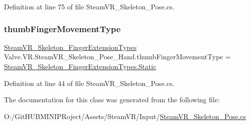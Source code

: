 Definition at line 75 of file Steam\+V\+R\+\_\+\+Skeleton\+\_\+\+Pose.\+cs.

\mbox{\label{class_valve_1_1_v_r_1_1_steam_v_r___skeleton___pose___hand_a4665f3a9254a6991ccf50ac84743b339}} 
\subsubsection{\texorpdfstring{thumbFingerMovementType}{thumbFingerMovementType}}
{\footnotesize\ttfamily \mbox{\hyperlink{namespace_valve_1_1_v_r_af4f7ce87893374f71b2fa2ba112642da}{Steam\+V\+R\+\_\+\+Skeleton\+\_\+\+Finger\+Extension\+Types}} Valve.\+V\+R.\+Steam\+V\+R\+\_\+\+Skeleton\+\_\+\+Pose\+\_\+\+Hand.\+thumb\+Finger\+Movement\+Type = \mbox{\hyperlink{namespace_valve_1_1_v_r_af4f7ce87893374f71b2fa2ba112642daa84a8921b25f505d0d2077aeb5db4bc16}{Steam\+V\+R\+\_\+\+Skeleton\+\_\+\+Finger\+Extension\+Types.\+Static}}}



Definition at line 44 of file Steam\+V\+R\+\_\+\+Skeleton\+\_\+\+Pose.\+cs.



The documentation for this class was generated from the following file\+:\begin{DoxyCompactItemize}
\item 
O\+:/\+Git\+H\+U\+B\+M\+I\+N\+I\+P\+Roject/\+Assets/\+Steam\+V\+R/\+Input/\mbox{\hyperlink{_steam_v_r___skeleton___pose_8cs}{Steam\+V\+R\+\_\+\+Skeleton\+\_\+\+Pose.\+cs}}\end{DoxyCompactItemize}
